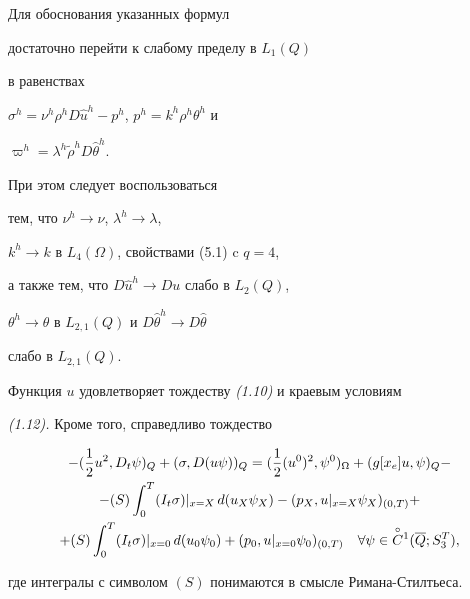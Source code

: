 \documentclass[12pt]{article}
\theoremstyle{plain} %
\newtheorem{lemm}{\hskip\parindent Лемма}[section]
\theoremstyle{definition}
\numberwithin{equation}{section}
\begin{document}
\begin{pf} Для обоснования указанных формул


достаточно перейти к слабому пределу в $L_1(Q)$


в равенствах


$\sigma^h=\nu^h \rho^h D\widehat u^h-p^h$, $p^h=k^h\rho^h\theta^h$ и


$\varpi^h=\lambda^h \widetilde\rho^h D\widehat\theta^h$.


При этом следует воспользоваться


тем, что $\nu^h\to\nu$, $\lambda^h\to\lambda$,


$k^h\to k$ в $L_4(\Omega)$, свойствами (5.1) c $q=4$,


а также тем, что $D\widehat u^h\to Du$ слабо в $L_2(Q)$,


$\theta^h\to\theta$ в $L_{2,1}(Q)$ и $D\widehat\theta^h\to D\widehat\theta$


слабо в $L_{2,1}(Q)$.


\end{pf}





\begin{lemm}


Функция $u$ удовлетворяет тождеству {\em (1.10)} и краевым условиям


{\em (1.12).} Кроме того, справедливо тождество


\begin{gather}


-(\frac{1}{2}u^2,D_t\psi)_Q + (\sigma, D(u\psi))_Q =


(\frac{1}{2}(u^0)^2,\psi^0)_\Omega + (g[x_e]u,\psi)_Q -\notag\\


%


-(S)\int_0^T(I_t\sigma)|_{x=X}\,d(u_X\psi_X) -


(p_X, u|_{x=X}\psi_X)_{(0,T)} +\notag\\


+(S)\int_0^T(I_t\sigma)|_{x=0}\,d(u_0\psi_0) +


(p_0, u|_{x=0}\psi_0)_{(0,T)}


\quad \forall \psi\in \overset{\circ}{C}{}^1(\overline Q; S^T_3),


\end{gather}


где интегралы с символом $(S)$ понимаются в смысле Римана-Стилтьеса.


\end{lemm}
\end{document}
